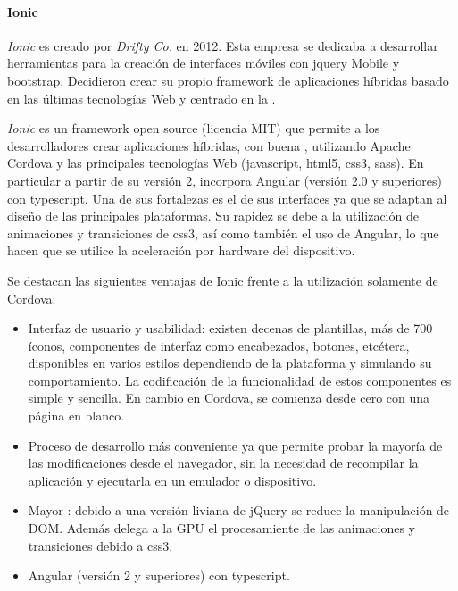 \paragraph{Ionic}
\label{ionic}

\textit{Ionic} es creado por \textit{Drifty Co.} en 2012. Esta empresa se dedicaba a desarrollar herramientas para la creación de interfaces móviles con \gls{jquery} Mobile y \gls{bootstrap}. Decidieron crear su propio \gls{framework} de aplicaciones híbridas basado en las últimas tecnologías Web y centrado en la .

\textit{Ionic} es un \gls{framework} \gls{open source} (licencia MIT) que permite a los desarrolladores crear aplicaciones híbridas, con buena , utilizando Apache Cordova y las principales tecnologías Web (\gls{javascript}, \gls{html}5, \gls{css}3, sass). En particular a partir de su versión 2, incorpora Angular (versión 2.0 y superiores) con \gls{typescript}. Una de sus fortalezas es el  de sus interfaces ya que se adaptan al diseño de las principales plataformas\cite{ionic2017concepts}. Su rapidez se debe a la utilización de animaciones y transiciones de \gls{css}3, así como también el uso de Angular, lo que hacen que se utilice la aceleración por hardware del dispositivo\cite{hartington2017animationsIonic}.

Se destacan las siguientes ventajas de Ionic frente a la utilización solamente de Cordova\cite{noupe2016ionicvscordova}:
\begin{itemize}
\item Interfaz de usuario y usabilidad: existen decenas de plantillas, más de 700 íconos, componentes de interfaz como encabezados, botones, etcétera, disponibles en varios estilos dependiendo de la plataforma y simulando su comportamiento. La codificación de la funcionalidad de estos componentes es simple y sencilla. En cambio en Cordova, se comienza desde cero con una página en blanco.
\item Proceso de desarrollo más conveniente ya que permite probar la mayoría de las modificaciones  desde el navegador, sin la necesidad de recompilar la aplicación y ejecutarla en un emulador o dispositivo.
\item Mayor : debido a una versión liviana de jQuery se reduce la manipulación de DOM. Además delega a la GPU el procesamiente de las animaciones y transiciones debido a \gls{css}3.
\item Angular (versión 2 y superiores) con \gls{typescript}.
\end{itemize}

